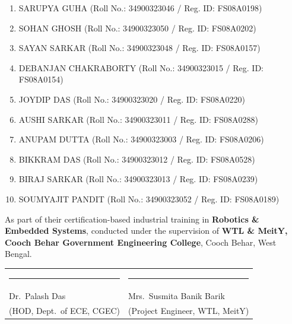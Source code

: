 \documentclass[12pt, a4paper]{article}
\begin{document}
\vspace{0.3cm}
\begin{enumerate}[label=\arabic*., leftmargin=2.5em, itemsep=6pt]
  \item SARUPYA GUHA \hfill (Roll No.: 34900323046 / Reg. ID: FS08A0198)
  \item SOHAN GHOSH \hfill (Roll No.: 34900323050 / Reg. ID: FS08A0202)
  \item SAYAN SARKAR \hfill (Roll No.: 34900323048 / Reg. ID: FS08A0157)
  \item DEBANJAN CHAKRABORTY \hfill (Roll No.: 34900323015 / Reg. ID: FS08A0154)
  \item JOYDIP DAS \hfill (Roll No.: 34900323020 / Reg. ID: FS08A0220)
  \item AUSHI SARKAR \hfill (Roll No.: 34900323011 / Reg. ID: FS08A0288)
  \item ANUPAM DUTTA \hfill (Roll No.: 34900323003 / Reg. ID: FS08A0206)
  \item BIKKRAM DAS \hfill (Roll No.: 34900323012 / Reg. ID: FS08A0528)
  \item BIRAJ SARKAR \hfill (Roll No.: 34900323013 / Reg. ID: FS08A0239)
  \item SOUMYAJIT PANDIT \hfill (Roll No.: 34900323052 / Reg. ID: FS08A0189)
\end{enumerate}

\vspace{0.5cm}

As part of their certification-based industrial training in
\textbf{Robotics \& Embedded Systems}, conducted under the supervision of
\textbf{WTL \& MeitY, Cooch Behar Government Engineering College},
Cooch Behar, West Bengal.

\vspace{3.5cm}

\noindent
\begin{tabular}{p{8cm} p{7cm}}
  \rule{7cm}{0.4pt} & \rule{7cm}{0.4pt} \\[5pt]
  Dr.\ Palash Das                  & Mrs.\ Susmita Banik Barik \\
  (HOD, Dept.\ of ECE, CGEC)       & (Project Engineer, WTL, MeitY)
\end{tabular}

\vfill

\newpage
\thispagestyle{plain}
\end{document}
